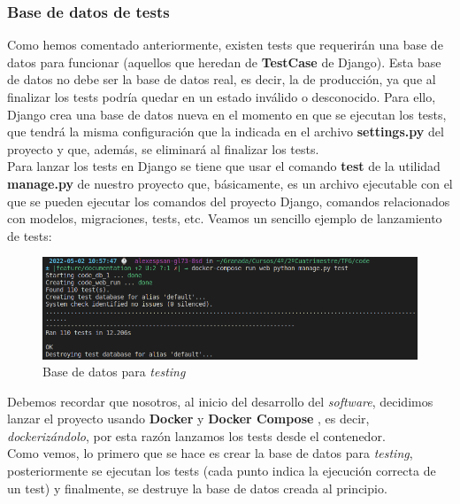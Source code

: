 \subsubsection{Base de datos de tests}
Como hemos comentado anteriormente, existen tests que requerirán una base de datos para
funcionar (aquellos que heredan de \textbf{TestCase} de Django). Esta base de datos no debe
ser la base de datos real, es decir, la de producción, ya que al finalizar los tests podría
quedar en un estado inválido o desconocido. Para ello, Django crea una base de datos nueva
en el momento en que se ejecutan los tests, que tendrá la misma configuración que la
indicada en el archivo \textbf{settings.py} del proyecto y que, además, se eliminará al
finalizar los tests.\\

Para lanzar los tests en Django se tiene que usar el comando \textbf{test} de la utilidad
\textbf{manage.py} de nuestro proyecto que, básicamente, es un archivo ejecutable con el
que se pueden ejecutar los comandos del proyecto Django, comandos relacionados con modelos,
migraciones, tests, etc. Veamos un sencillo ejemplo de lanzamiento de tests:

    \begin{figure}[H]
        \centering
        \includegraphics[scale=0.40]{imagenes/db-test.png}
        \caption{Base de datos para \textit{testing}}
        \label{fig:db-test}
    \end{figure}

Debemos recordar que nosotros, al inicio del desarrollo del \textit{software}, decidimos
lanzar el proyecto usando \textbf{Docker} \cite{docker} y \textbf{Docker Compose}
\cite{docker-compose}, es decir, \textit{dockerizándolo}, por esta razón lanzamos
los tests desde el contenedor.\\

Como vemos, lo primero que se hace es crear la base de datos para \textit{testing},
posteriormente se ejecutan los tests (cada punto indica la ejecución correcta de un test)
y finalmente, se destruye la base de datos creada al principio.\\

